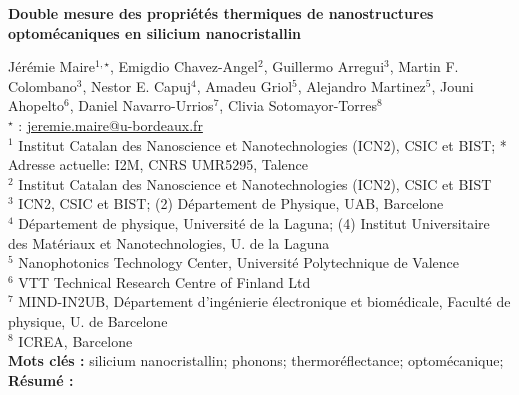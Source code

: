 


    \newpage

\BgThispage

%
\begin{flushleft}
\addtocounter{section}{1}
{\Large \textbf{Double mesure des propriétés thermiques de nanostructures optomécaniques en silicium nanocristallin}}\label{ref:67}
\end{flushleft}
%
Jérémie Maire$^{1,\star}$, Emigdio Chavez-Angel$^{2}$, Guillermo Arregui$^{3}$, Martin F. Colombano$^{3}$, Nestor E. Capuj$^{4}$, Amadeu Griol$^{5}$, Alejandro Martinez$^{5}$, Jouni Ahopelto$^{6}$, Daniel Navarro-Urrios$^{7}$, Clivia Sotomayor-Torres$^{8}$\\[2mm]
$^{\star}$ \Letter : \url{jeremie.maire@u-bordeaux.fr}\\[2mm]
{\footnotesize $^{1}$ Institut Catalan des Nanoscience et Nanotechnologies (ICN2), CSIC et BIST;   * Adresse actuelle: I2M, CNRS UMR5295, Talence}\\
{\footnotesize $^{2}$ Institut Catalan des Nanoscience et Nanotechnologies (ICN2), CSIC et BIST}\\
{\footnotesize $^{3}$ ICN2, CSIC et BIST; (2) Département de Physique, UAB, Barcelone}\\
{\footnotesize $^{4}$ Département de physique, Université de la Laguna; (4) Institut Universitaire des Matériaux et Nanotechnologies, U. de la Laguna}\\
{\footnotesize $^{5}$ Nanophotonics Technology Center, Université Polytechnique de Valence}\\
{\footnotesize $^{6}$ VTT Technical Research Centre of Finland Ltd}\\
{\footnotesize $^{7}$ MIND-IN2UB, Département d'ingénierie électronique et biomédicale, Faculté de physique, U. de Barcelone}\\
{\footnotesize $^{8}$ ICREA, Barcelone}\\
[4mm]
%
\noindent \textbf{Mots clés : } silicium nanocristallin; phonons; thermoréflectance; optomécanique;\\[4mm]
%
\noindent \textbf{Résumé : } 

